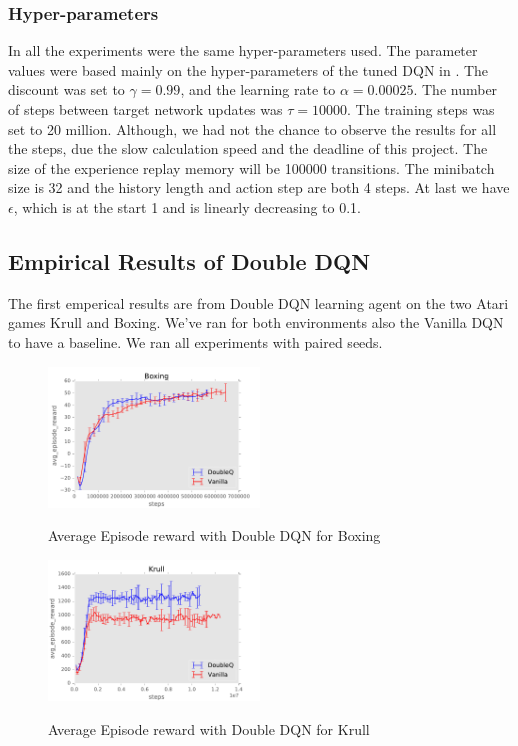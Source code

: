 \documentclass{sig-alternate}
\begin{document}
\subsubsection{Hyper-parameters}\label{Hyper parameters}

In all the experiments were the same hyper-parameters used. The parameter values were based mainly on the hyper-parameters of the tuned DQN in \cite{mnih2015human}. The discount was set to $\gamma=0.99$, and the learning rate to $\alpha=0.00025$. The number of steps between target network updates was $\tau= 10000$. The training steps was set to 20 million. Although, we had not the chance to observe the results for all the steps, due the slow calculation speed and the deadline of this project. The size of the experience replay memory will be 100000 transitions. The minibatch size is 32 and the history length and action step are both 4 steps. At last we have $\epsilon$, which is at the start 1 and is linearly decreasing to 0.1.

\subsection{Empirical Results of Double DQN}

The first emperical results are from Double DQN learning agent on the two Atari games Krull and Boxing. We've ran for both environments also the Vanilla DQN to have a baseline. We ran all experiments with paired seeds. 


\begin{figure}[h!]
    \centering
    \includegraphics[width=0.5\textwidth]{../results/Boxing/Comparisons/DoubleQ/DoubleQ-baseline-avg_episode_reward.pdf}
    \label{boxing Double DQN}
    \caption{Average Episode reward with Double DQN for Boxing}
\end{figure}

\begin{figure}[h!]
    \centering
    \includegraphics[width=0.5\textwidth]{../results/Krull/Comparisons/DoubleQ/DoubleQ-baseline-avg_episode_reward.pdf}
    \label{krull Double DQN}
    \caption{Average Episode reward with Double DQN for Krull}
\end{figure}
\end{document}
